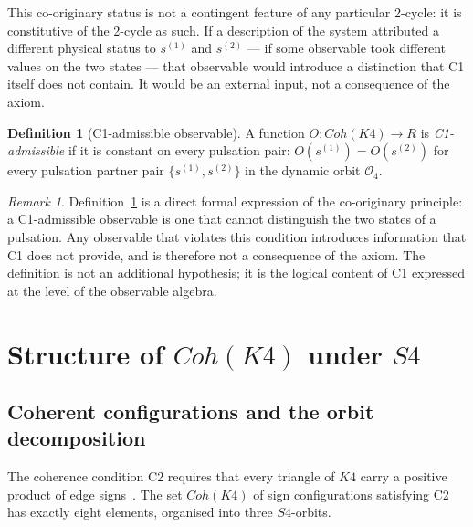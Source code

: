 \documentclass[11pt,a4paper]{article}
\def\Sfour{S4}%
\def\Kfour{K4}%
\def\mathbb#1{#1}%
\def\mathrm#1{#1}%
\theoremstyle{plain}
\theoremstyle{definition}
\newtheorem{definition}[theorem]{Definition}
\theoremstyle{remark}
\newtheorem{remark}[theorem]{Remark}
\newcommand{\Kfour}{K_4}
\newcommand{\Sfour}{S_4}
\newcommand{\Coh}{\mathrm{Coh}}
\newcommand{\Orb}[1]{\mathcal{O}_{#1}}
\begin{document}
This co-originary status is not a contingent feature of any particular 2-cycle: it is
constitutive of the 2-cycle as such. If a description of the system attributed a different
physical status to $s^{(1)}$ and $s^{(2)}$ --- if some observable took different values on
the two states --- that observable would introduce a distinction that C1 itself does not
contain. It would be an external input, not a consequence of the axiom.

\begin{definition}[C1-admissible observable]
\label{def:C1admissible}
A function $O : \Coh(\Kfour) \to \mathbb{R}$ is \emph{C1-admissible} if it is constant on
every pulsation pair: $O(s^{(1)}) = O(s^{(2)})$ for every pulsation partner pair
$\{s^{(1)}, s^{(2)}\}$ in the dynamic orbit $\Orb{4}$.
\end{definition}

\begin{remark}
Definition~\ref{def:C1admissible} is a direct formal expression of the co-originary
principle: a C1-admissible observable is one that cannot distinguish the two states of a
pulsation. Any observable that violates this condition introduces information that C1 does
not provide, and is therefore not a consequence of the axiom. The definition is not an
additional hypothesis; it is the logical content of C1 expressed at the level of the
observable algebra.
\end{remark}

\section{Structure of \texorpdfstring{$\Coh(\Kfour)$}{Coh(K4)} under
\texorpdfstring{$\Sfour$}{S4}}
\label{sec:structure}

\subsection{Coherent configurations and the orbit decomposition}

The coherence condition C2 requires that every triangle of $\Kfour$ carry a positive
product of edge signs~\cite{PDL_D16a}. The set $\Coh(\Kfour)$ of sign configurations
satisfying C2 has exactly eight elements, organised into three $\Sfour$-orbits.
\end{document}
